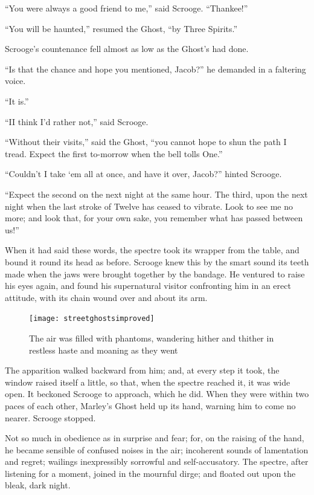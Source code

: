 \documentclass[paper=5.5in:8.5in,BCOR=5mm,twoside,DIV=calc,12pt,usegeometry]{scrbook} %
\begin{document}
\enquote{You were always a good friend to me,} said Scrooge. \enquote{Thankee!}

\enquote{You will be haunted,} resumed the Ghost, \enquote{by Three Spirits.}




Scrooge's countenance fell almost as low as the Ghost's had done.

\enquote{Is that the chance and hope you mentioned, Jacob?} he demanded in a faltering voice.

\enquote{It is.}

\enquote{I\textemdash I think I'd rather not,} said Scrooge.

\enquote{Without their visits,} said the Ghost, \enquote{you cannot hope to shun the path I tread. Expect the first to-morrow when the bell tolls One.}

\enquote{Couldn't I take `em all at once, and have it over, Jacob?} hinted Scrooge.

\enquote{Expect the second on the next night at the same hour. The third, upon the next night when the last stroke of Twelve has ceased to vibrate. Look to see me no more; and look that, for your own sake, you remember what has passed between us!}

When it had said these words, the spectre took its wrapper from the table, and bound it round its head as before. Scrooge knew this by the smart sound its teeth made when the jaws were brought together by the bandage. He ventured to raise his eyes again, and found his supernatural visitor confronting him in an erect attitude, with its chain wound over and about its arm.

\begin{figure}[p]
\begin{minipage}[c]{\linewidth}
\texttt{[image: streetghostsimproved]}
\caption*{The air was filled with phantoms, wandering hither and thither in restless haste and moaning as they went}
\end{minipage}
\end{figure}

The apparition walked backward from him; and, at every step it took, the window raised itself a little, so that, when the spectre reached it, it was wide open. It beckoned Scrooge to approach, which he did. When they were within two paces of each other, Marley's Ghost held up its hand, warning him to come no nearer. Scrooge stopped.

Not so much in obedience as in surprise and fear; for, on the raising of the hand, he became sensible of confused noises in the air; incoherent sounds of lamentation and regret; wailings inexpressibly sorrowful and self-accusatory. The spectre, after listening for a moment, joined in the mournful dirge; and floated out upon the bleak, dark night.
\end{document}

